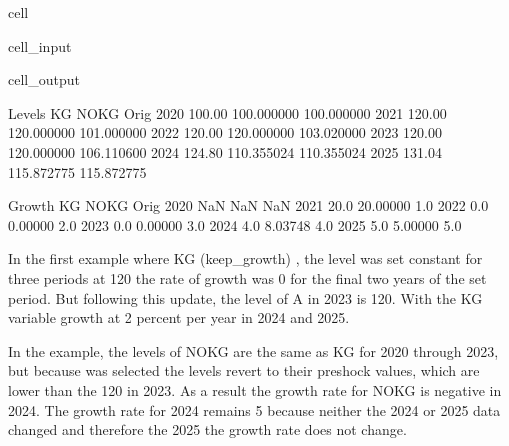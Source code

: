 \documentclass[letterpaper,10pt,english]{jupyterBook}
\begin{document}
\begin{sphinxuseclass}{cell}
\begin{sphinxVerbatimInput}
\begin{sphinxuseclass}{cell_input}
\begin{sphinxVerbatim}[commandchars=\\\{\}]
\end{sphinxVerbatim}

\end{sphinxuseclass}\end{sphinxVerbatimInput}
\begin{sphinxVerbatimOutput}

\begin{sphinxuseclass}{cell_output}
\begin{sphinxVerbatim}[commandchars=\\\{\}]
Levels
          KG        NOKG        Orig
2020  100.00  100.000000  100.000000
2021  120.00  120.000000  101.000000
2022  120.00  120.000000  103.020000
2023  120.00  120.000000  106.110600
2024  124.80  110.355024  110.355024
2025  131.04  115.872775  115.872775

Growth
        KG      NOKG  Orig
2020   NaN       NaN   NaN
2021  20.0  20.00000   1.0
2022   0.0   0.00000   2.0
2023   0.0   0.00000   3.0
2024   4.0  \PYGZhy{}8.03748   4.0
2025   5.0   5.00000   5.0
\end{sphinxVerbatim}

\end{sphinxuseclass}\end{sphinxVerbatimOutput}

\end{sphinxuseclass}
\sphinxAtStartPar
{}

\sphinxAtStartPar
In the first example where KG (keep\_growth) , the level was set constant for three periods at 120 the rate of growth was 0 for the final two years of the set period.  But following this update, the level of A in 2023 is 120. With  the KG variable growth at 2 percent per year in 2024 and 2025.

\sphinxAtStartPar
In the  example, the levels of NOKG are the same as KG for 2020 through 2023, but because  was selected the levels revert to their pre\sphinxhyphen{}shock values, which are lower than the 120 in 2023.  As a result the growth rate for NOKG is negative in 2024. The growth rate for 2024 remains 5 because neither the 2024 or 2025 data changed and therefore the 2025 the growth rate does not change.
\end{document}
